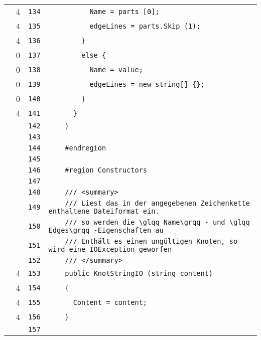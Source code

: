 \documentclass[a4paper,10pt]{article}
\begin{document}
\begin{longtable}[l]{lrrl}
\cellcolor{green} & 4 & \verb~134~ & \verb~          Name = parts [0];~\\
\cellcolor{green} & 4 & \verb~135~ & \verb~          edgeLines = parts.Skip (1);~\\
\cellcolor{green} & 4 & \verb~136~ & \verb~        }~\\
\cellcolor{red} & 0 & \verb~137~ & \verb~        else {~\\
\cellcolor{red} & 0 & \verb~138~ & \verb~          Name = value;~\\
\cellcolor{red} & 0 & \verb~139~ & \verb~          edgeLines = new string[] {};~\\
\cellcolor{red} & 0 & \verb~140~ & \verb~        }~\\
\cellcolor{green} & 4 & \verb~141~ & \verb~      }~\\
\cellcolor{gray} &  & \verb~142~ & \verb~    }~\\
\cellcolor{gray} &  & \verb~143~ & \verb~~\\
\cellcolor{gray} &  & \verb~144~ & \verb~    #endregion~\\
\cellcolor{gray} &  & \verb~145~ & \verb~~\\
\cellcolor{gray} &  & \verb~146~ & \verb~    #region Constructors~\\
\cellcolor{gray} &  & \verb~147~ & \verb~~\\
\cellcolor{gray} &  & \verb~148~ & \verb~    /// <summary>~\\
\cellcolor{gray} &  & \verb~149~ & \verb~    /// Liest das in der angegebenen Zeichenkette enthaltene Dateiformat ein. ~\\
\cellcolor{gray} &  & \verb~150~ & \verb~    /// so werden die \glqq Name\grqq - und \glqq Edges\grqq -Eigenschaften au~\\
\cellcolor{gray} &  & \verb~151~ & \verb~    /// Enthält es einen ungültigen Knoten, so wird eine IOException geworfen ~\\
\cellcolor{gray} &  & \verb~152~ & \verb~    /// </summary>~\\
\cellcolor{green} & 4 & \verb~153~ & \verb~    public KnotStringIO (string content)~\\
\cellcolor{green} & 4 & \verb~154~ & \verb~    {~\\
\cellcolor{green} & 4 & \verb~155~ & \verb~      Content = content;~\\
\cellcolor{green} & 4 & \verb~156~ & \verb~    }~\\
\cellcolor{gray} &  & \verb~157~ & \verb~~\\

\end{longtable}
\end{document}
